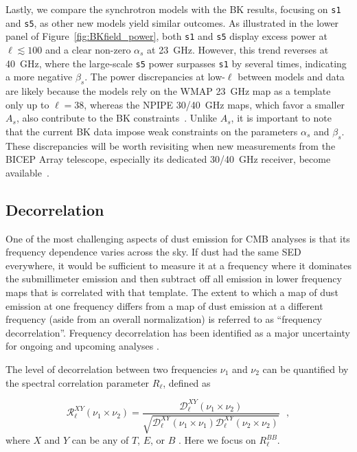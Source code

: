 \documentclass[twocolumn]{aastex631}
\begin{document}
Lastly, we compare the synchrotron models with the BK results, focusing on \texttt{s1} and \texttt{s5}, as other new models yield similar outcomes. As illustrated in the lower panel of Figure~\ref{fig:BKfield_power}, both \texttt{s1} and \texttt{s5} display excess power at $\ell \lesssim 100$ and a clear non-zero $\alpha_s$ at 23~GHz. However, this trend reverses at 40~GHz, where the large-scale \texttt{s5} power surpasses \texttt{s1} by several times, indicating a more negative $\beta_s$. The power discrepancies at low-$\ell$ between models and data are likely because the models rely on the WMAP 23~GHz map as a template only up to $\ell = 38$, whereas the NPIPE 30/40~GHz maps, which favor a smaller $A_s$, also contribute to the BK constraints~\citep[][Figure~21]{Ade:2021}. Unlike $A_s$, it is important to note that the current BK data impose weak constraints on the parameters $\alpha_s$ and $\beta_s$. These discrepancies will be worth revisiting when new measurements from the BICEP Array telescope, especially its dedicated 30/40~GHz receiver, become available~\citep{Moncelsi:2020}.


\subsection{Decorrelation} \label{subsec:decorrelation}

One of the most challenging aspects of dust emission for CMB analyses is that its frequency dependence varies across the sky. If dust had the same SED everywhere, it would be sufficient to measure it at a frequency where it dominates the submillimeter emission and then subtract off all emission in lower frequency maps that is correlated with that template. The extent to which a map of dust emission at one frequency differs from a map of dust emission at a different frequency (aside from an overall normalization) is referred to as ``frequency decorrelation''. Frequency decorrelation has been identified as a major uncertainty for ongoing and upcoming analyses \citep{Ade:2021}.

The level of decorrelation between two frequencies $\nu_1$ and $\nu_2$ can be quantified by the spectral correlation parameter $R_\ell$, defined as

\begin{equation} \label{eq:R_ell}
    \mathcal{R}^{XY}_\ell(\nu_1\times\nu_2) = \frac{\mathcal{D}_\ell^{XY}(\nu_1\times\nu_2)}{\sqrt{\mathcal{D}_\ell^{XY}(\nu_1\times\nu_1)\mathcal{D}_\ell^{XY}(\nu_2\times\nu_2)}}
    ~~~,
\end{equation}
where $X$ and $Y$ can be any of $T$, $E$, or $B$ \citep{planck2016-L}. Here we focus on $R_\ell^{BB}$.
\end{document}
